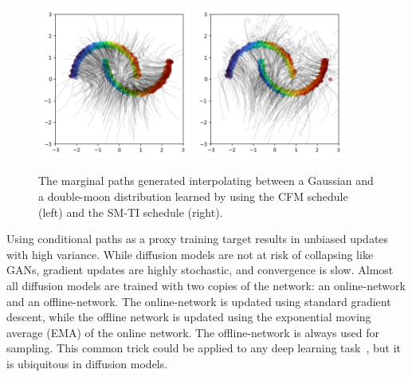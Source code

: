 \begin{figure}[ht]
    \centering
    \includegraphics[width=0.45\textwidth]{Figures/generative_models/fm.png}
    \includegraphics[width=0.45\textwidth]{Figures/generative_models/vp.png}
    \caption{The marginal paths generated interpolating between a Gaussian and a double-moon distribution learned by using the CFM schedule (left) and the SM-TI schedule (right).}
    \label{fig:vp_vs_cfm}
\end{figure}

Using conditional paths as a proxy training target results in unbiased updates with high variance.
While diffusion models are not at risk of collapsing like GANs, gradient updates are highly stochastic, and convergence is slow.
Almost all diffusion models are trained with two copies of the network: an online-network and an offline-network.
The online-network is updated using standard gradient descent, while the offline network is updated using the exponential moving average (EMA) of the online network.
The offline-network is always used for sampling.
This common trick could be applied to any deep learning task~\cite{Adam}, but it is ubiquitous in diffusion models.

